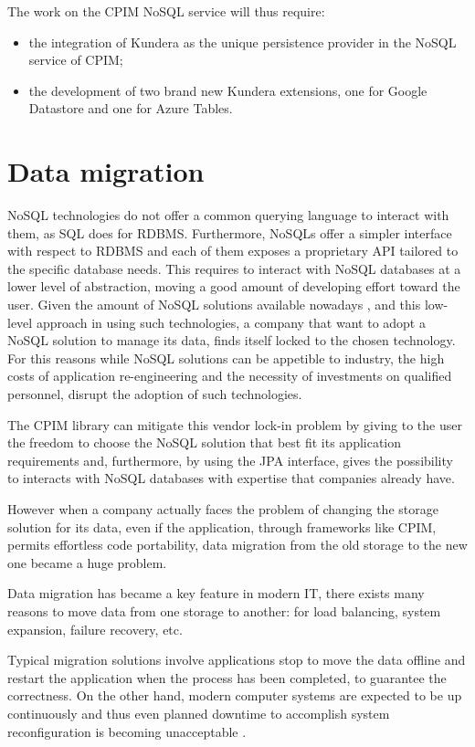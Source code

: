 \newparagraph The work on the CPIM NoSQL service will thus require:
\begin{itemize}
\item the integration of Kundera as the unique persistence provider in the NoSQL service of CPIM;
\item the development of two brand new Kundera extensions, one for Google Datastore and one for Azure Tables.
\end{itemize}

\section{Data migration}
NoSQL technologies do not offer a common querying language to interact with them, as SQL does for RDBMS. Furthermore, NoSQLs offer a simpler interface with respect to RDBMS and each of them exposes a proprietary API tailored to the specific database needs. This requires to interact with NoSQL databases at a lower level of abstraction, moving a good amount of developing effort toward the user.
Given the amount of NoSQL solutions available nowadays \cite{online:nosql-database.org}, and this low-level approach in using such technologies, a company that want to adopt a NoSQL solution to manage its data, finds itself locked to the chosen technology. 
For this reasons while NoSQL solutions can be appetible to industry, the high costs of application re-engineering and the necessity of investments on qualified personnel, disrupt the adoption of such technologies.

\noindent The CPIM library can mitigate this vendor lock-in problem by giving to the user the freedom to choose the NoSQL solution that best fit its application requirements and, furthermore, by using the JPA interface, gives the possibility to interacts with NoSQL databases with expertise that companies already have.

\noindent However when a company actually faces the problem of changing the storage solution for its data, even if the application, through frameworks like CPIM, permits effortless code portability, data migration from the old storage to the new one became a huge problem. 

\newparagraph Data migration has became a key feature in modern IT, there exists many reasons to move data from one storage to another: for load balancing, system expansion, failure recovery, etc.

\noindent Typical migration solutions involve applications stop to move the data offline and restart the application when the process has been completed, to guarantee the correctness. On the other hand, modern computer systems are expected to be up continuously and thus even planned downtime to accomplish system reconfiguration is becoming unacceptable \cite{paper:hitachi}.

